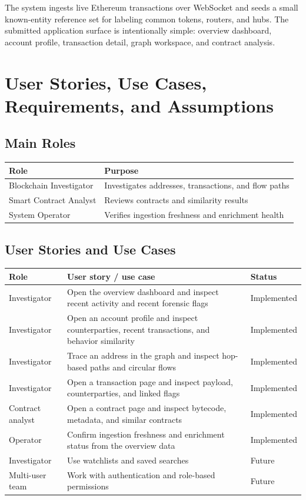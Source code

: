 \documentclass[11pt,a4paper]{article}
\begin{document}
The system ingests live Ethereum transactions over WebSocket and seeds a small
known-entity reference set for labeling common tokens, routers, and hubs. The
submitted application surface is intentionally simple: overview dashboard,
account profile, transaction detail, graph workspace, and contract analysis.

\section{User Stories, Use Cases, Requirements, and Assumptions}

\subsection{Main Roles}

\begin{tabularx}{\textwidth}{@{}p{}Y@{}}
\toprule
\textbf{Role} & \textbf{Purpose} \\
\midrule
Blockchain Investigator & Investigates addresses, transactions, and flow paths \\
Smart Contract Analyst & Reviews contracts and similarity results \\
System Operator & Verifies ingestion freshness and enrichment health \\
\bottomrule
\end{tabularx}

\subsection{User Stories and Use Cases}

\begin{longtable}{@{}p{}p{}p{}@{}}
\toprule
\textbf{Role} & \textbf{User story / use case} & \textbf{Status} \\
\midrule
\endhead
Investigator & Open the overview dashboard and inspect recent activity and recent forensic flags & Implemented \\
Investigator & Open an account profile and inspect counterparties, recent transactions, and behavior similarity & Implemented \\
Investigator & Trace an address in the graph and inspect hop-based paths and circular flows & Implemented \\
Investigator & Open a transaction page and inspect payload, counterparties, and linked flags & Implemented \\
Contract analyst & Open a contract page and inspect bytecode, metadata, and similar contracts & Implemented \\
Operator & Confirm ingestion freshness and enrichment status from the overview data & Implemented \\
Investigator & Use watchlists and saved searches & Future \\
Multi-user team & Work with authentication and role-based permissions & Future \\
\bottomrule
\end{longtable}
\end{document}
